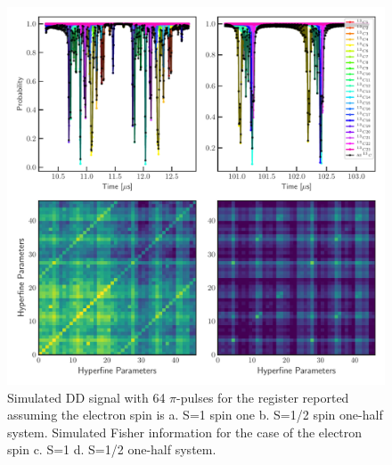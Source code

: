 \documentclass[%
 reprint,
superscriptaddress,
 amsmath,amssymb,
 aps,
]{revtex4-2}
\begin{document}
\begin{figure}%
	\begin{center}
		\includegraphics[width=0.9\columnwidth]{pict/dd_compare2.pdf}
		\caption{Simulated DD signal with 64 $\pi$-pulses for the register reported \cite{abobeih2019atomic} assuming the electron spin is a. S=1 spin one b. S=1/2 spin one-half system. Simulated Fisher information for the case of the electron spin c. S=1 d. S=1/2 one-half system.}
		\label{fig:3}
	\end{center}
\end{figure}
\end{document}
